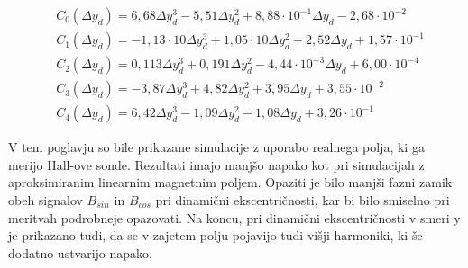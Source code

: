 \begin{eqnarray}
&C_0 (\Delta y_d) =6,68\Delta y_d^{3}-5,51\Delta y_d^{2}+8,88\cdot 10^{-1}\Delta y_d-2,68\cdot 10^{-2} \\                          
&C_1 (\Delta y_d) =-1,13\cdot 10\Delta y_d^{3}+1,05\cdot 10\Delta y_d^{2}+2,52\Delta y_d+1,57\cdot 10^{-1} \\                      
&C_2 (\Delta y_d) =0,113\Delta y_d^{3}+0,191\Delta y_d^{2}-4,44\cdot 10^{-3}\Delta y_d+6,00\cdot 10^{-4} \\
&C_3  (\Delta y_d)=-3,87\Delta y_d^{3}+4,82\Delta y_d^{2}+3,95\Delta y_d+3,55\cdot 10^{-2} \\                                      
&C_4 (\Delta y_d) =6,42\Delta y_d^{3}-1,09\Delta y_d^{2}-1,08\Delta y_d+3,26\cdot 10^{-1}       
\end{eqnarray}

V tem poglavju so bile prikazane simulacije z uporabo realnega polja, ki ga merijo Hall-ove sonde. Rezultati imajo manjšo napako kot pri simulacijah z aproksimiranim linearnim magnetnim poljem. Opaziti je bilo manjši fazni zamik obeh signalov $B_{sin}$ in $B_{cos}$ pri dinamični ekscentričnosti, kar bi bilo smiselno pri meritvah podrobneje opazovati. Na koncu, pri dinamični ekscentričnosti v smeri y je prikazano tudi, da se v zajetem polju pojavijo tudi višji harmoniki, ki še dodatno ustvarijo napako.